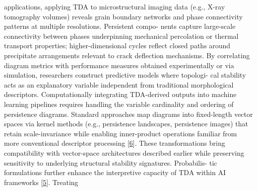 \documentclass[
]{article}
\begin{document}
applications, applying TDA to microstructural imaging data (e.g., X-ray
tomography volumes) reveals grain boundary networks and phase
connectivity patterns at multiple resolutions. Persistent compo- nents
capture large-scale connectivity between phases underpinning mechanical
percolation or thermal transport properties; higher-dimensional cycles
reflect closed paths around precipitate arrangements relevant to crack
deflection mechanisms. By correlating diagram metrics with performance
measures obtained experimentally or via simulation, researchers
construct predictive models where topologi- cal stability acts as an
explanatory variable independent from traditional morphological
descriptors. Computationally integrating TDA-derived outputs into
machine learning pipelines requires handling the variable cardinality
and ordering of persistence diagrams. Standard approaches map diagrams
into fixed-length vector spaces via kernel methods (e.g., persistence
landscapes, persistence images) that retain scale-invariance while
enabling inner-product operations familiar from more conventional
descriptor processing {[}\protect\hyperlink{_bookmark46}{6}{]}. These
transformations bring compatibility with vector-space architectures
described earlier while preserving sensitivity to underlying structural
stability signatures. Probabilis- tic formulations further enhance the
interpretive capacity of TDA within AI frameworks
{[}\protect\hyperlink{_bookmark45}{5}{]}. Treating
\end{document}

